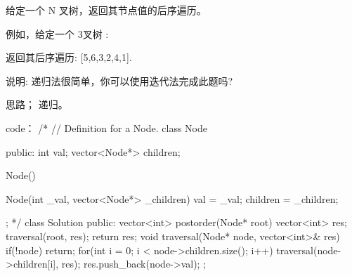 给定一个 N 叉树，返回其节点值的后序遍历。

例如，给定一个 3叉树 :

 

 

返回其后序遍历: [5,6,3,2,4,1].

 

说明: 递归法很简单，你可以使用迭代法完成此题吗?


























思路；
递归。




























code：
/*
// Definition for a Node.
class Node {
public:
    int val;
    vector<Node*> children;

    Node() {}

    Node(int _val, vector<Node*> _children) {
        val = _val;
        children = _children;
    }
};
*/
class Solution {
public:
    vector<int> postorder(Node* root) {
        vector<int> res;
        traversal(root, res);
        return res;
    }
    void traversal(Node* node, vector<int>& res)
    {
        if(!node) return;
        for(int i = 0; i < node->children.size(); i++)
        {
            traversal(node->children[i], res);
        }
        res.push_back(node->val);
    }
};